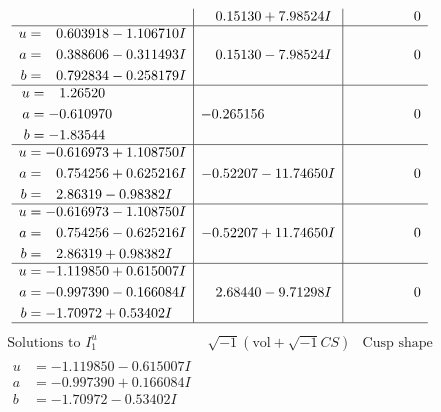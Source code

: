 \documentclass[1p]{elsarticle_modified}
\theoremstyle{definition}
\newcommand{\I}{\sqrt{-1}}
\begin{document}
$$\begin{array}{c|c|c}
 & \phantom{-}0.15130 + 7.98524 I & \phantom{-0.000000 } 0 \\ \hline\begin{aligned}
u &= \phantom{-}0.603918 - 1.106710 I \\
a &= \phantom{-}0.388606 - 0.311493 I \\
b &= \phantom{-}0.792834 - 0.258179 I\end{aligned}
 & \phantom{-}0.15130 - 7.98524 I & \phantom{-0.000000 } 0 \\ \hline\begin{aligned}
u &= \phantom{-}1.26520\phantom{ +0.000000I} \\
a &= -0.610970\phantom{ +0.000000I} \\
b &= -1.83544\phantom{ +0.000000I}\end{aligned}
 & -0.265156\phantom{ +0.000000I} & \phantom{-0.000000 } 0 \\ \hline\begin{aligned}
u &= -0.616973 + 1.108750 I \\
a &= \phantom{-}0.754256 + 0.625216 I \\
b &= \phantom{-}2.86319 - 0.98382 I\end{aligned}
 & -0.52207 - 11.74650 I & \phantom{-0.000000 } 0 \\ \hline\begin{aligned}
u &= -0.616973 - 1.108750 I \\
a &= \phantom{-}0.754256 - 0.625216 I \\
b &= \phantom{-}2.86319 + 0.98382 I\end{aligned}
 & -0.52207 + 11.74650 I & \phantom{-0.000000 } 0 \\ \hline\begin{aligned}
u &= -1.119850 + 0.615007 I \\
a &= -0.997390 - 0.166084 I \\
b &= -1.70972 + 0.53402 I\end{aligned}
 & \phantom{-}2.68440 - 9.71298 I & \phantom{-0.000000 } 0\\
 \hline 
 \end{array}$$\newpage$$\begin{array}{c|c|c}  
\text{Solutions to }I^u_{1}& \I (\text{vol} + \sqrt{-1}CS) & \text{Cusp shape}\\
 \hline 
\begin{aligned}
u &= -1.119850 - 0.615007 I \\
a &= -0.997390 + 0.166084 I \\
b &= -1.70972 - 0.53402 I\end{aligned}

\end{array}$$
\end{document}
